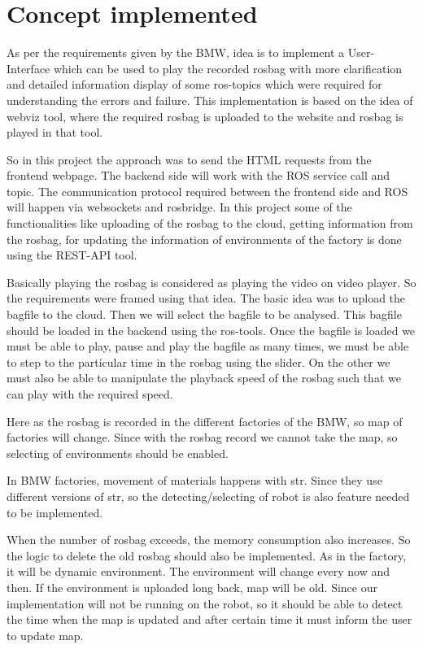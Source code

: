 \chapter{Concept implemented}
As per the requirements given by the BMW, idea is to implement a User-Interface which can be used to play the recorded rosbag with more clarification and detailed information display of some ros-topics which were required for understanding the errors and failure. This implementation is based on the idea of webviz tool, where the required rosbag is uploaded to the website and rosbag is played in that tool.

So in this project the approach was to send the HTML requests from the frontend webpage. The backend side will work with the ROS service call and topic. The communication protocol required between the frontend side and ROS will happen via websockets and rosbridge. In this project some of the functionalities like uploading of the rosbag to the cloud, getting information from the rosbag, for updating the information of environments of the factory is done using the REST-API tool.  

Basically playing the rosbag is considered as playing the video on video player. So the requirements were framed using that idea. The basic idea was to upload the bagfile to the cloud. Then we will select the bagfile to be analysed. This bagfile should be loaded in the backend using the ros-tools. Once the bagfile is loaded we must be able to play, pause and play the bagfile as many times, we must be able to step to the particular time in the rosbag using the slider. On the other we must also be able to manipulate the playback speed of the rosbag such that we can play with the required speed. 

Here as the rosbag is recorded in the different factories of the BMW, so map of factories will change. Since with the rosbag record we cannot take the map, so selecting of environments should be enabled. 

In BMW factories, movement of materials happens with str. Since they use different versions of str, so the detecting/selecting of robot is also feature needed to be implemented.

When the number of rosbag exceeds, the memory consumption also increases. So the logic to delete the old rosbag should also be implemented. As in the factory, it will be dynamic environment. The environment will change every now and then. If the environment is uploaded long back, map will be old. Since our implementation will not be running on the robot, so it should be able to detect the time when the map is updated and after certain time it must inform the user to update map. 

